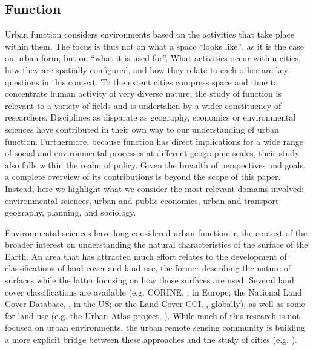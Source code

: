 \subsection{Function}
\label{sec:lit_function}


Urban function considers environments based on the activities that take place
within them.
%
The focus is thus not on what a space ``looks
like'', as it is the case on urban form, but on ``what it is used for''. What
activities occur within cities, how they are spatially configured, and how
they relate to each other are key questions in this context.
%
To the extent cities compress space and time to concentrate human activity of
very diverse nature, the study of function is relevant to a variety of
fields and is undertaken by a wider constituency of researchers. Disciplines
as disparate as geography, economics or environmental sciences have contributed in their own way to our understanding of urban
function.
Furthermore, because function has direct implications for a wide range of
social and environmental processes at different geographic scales, their study
also falls within the realm of policy.
%
Given the breadth of perspectives and goals, a complete overview of its
contributions is beyond
the scope of this paper. Instead, here we highlight what we consider the
most relevant domains involved: environmental
sciences, urban and public economics, urban and transport geography, planning, and
sociology.

Environmental sciences have long considered urban function
in the context of the broader interest on understanding the natural
characteristics of the surface of the Earth.
An area that has attracted much effort relates to the development of
classifications of land cover and land use, the former describing the nature of
surfaces while the latter focusing on how those surfaces are used. Several
land cover classifications are available (e.g. CORINE,
        \citealp{europeanenvironmentagency1990}, in Europe;
the National Land Cover Database, \citealp{homer2012national}, in the US; or
the Land Cover CCI, \citealp{defourny2012land}, globally), as well as some
for land use (e.g. the Urban Atlas project, \citealp{urban_atlas}).
While much of this research is not focused on urban environments, the urban
remote sensing community \citep{weng2018urban} is building a more explicit
bridge between these approaches and the study of cities
(e.g. \citealp{kuffer2016slums, georganos2018very, JOCHEM2018104, prasad2015remotely, stark2020satellite}).

